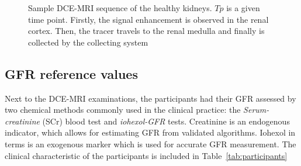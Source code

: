 \begin{figure}[H]
			\hspace{0.005\linewidth}
		\hspace{0.005\linewidth}
	\hspace{0.005\linewidth}
\vspace{0.5cm}
\caption[Sample DCE-MRI sequence of the healthy kidneys.]{Sample DCE-MRI sequence of the healthy kidneys. $Tp$ is a given time point. Firstly, the signal enhancement is observed in the renal cortex. Then, the tracer travels to the renal medulla and finally is collected by the collecting system}
\label{fig:set}
\end{figure}


\subsection{GFR reference values}
Next to the DCE-MRI examinations, the participants had their GFR assessed by two chemical methods commonly used in the clinical practice: the \textit{Serum-creatinine} (SCr) blood test and \textit{iohexol-GFR} tests. Creatinine is an endogenous indicator, which allows for estimating GFR from validated algorithms.
Iohexol in terms is an exogenous marker which is used for accurate GFR measurement. The clinical characteristic of the participants is included in Table~\ref{tab:participants}

